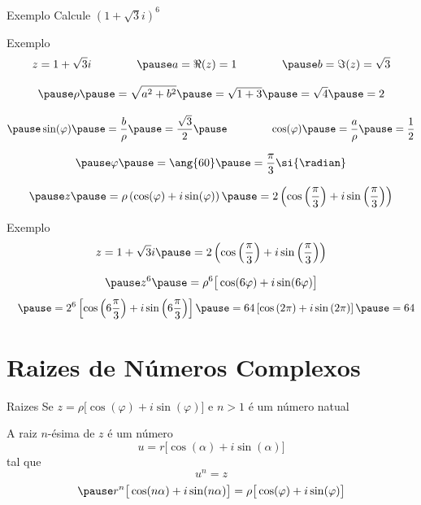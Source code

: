 \addtocounter{exemplo}{1}
\begin{frame}{Exemplo \theexemplo}
  Calcule \(\left(1+\sqrt{3}i\right)^6\)
\end{frame}

\begin{frame}{Exemplo \theexemplo}
  \[
    z = 1+\sqrt{3}i
    \qquad\qquad
    \pause
    a = \Re(z) = 1
    \qquad\qquad
    \pause
    b = \Im(z) = \sqrt{3}
  \]

  \[
    \pause
    \rho
    \pause
    = \sqrt{a^2 + b^2}
    \pause
    = \sqrt{1 + 3}
    \pause
    = \sqrt{4}
    \pause
    = 2
  \]

  \[
    \pause
    \sin(\varphi)
    \pause
    = \frac{b}{\rho}
    \pause
    = \frac{\sqrt{3}}{2}
    \pause
    \qquad\qquad
    \cos(\varphi)
    \pause
    = \frac{a}{\rho}
    \pause
    = \frac{1}{2}
  \]

  \[
    \pause
    \varphi
    \pause
    = \ang{60}
    \pause
    = \frac{\pi}{3} \si{\radian}
  \]

  \[
    \pause
    z
    \pause
    = \rho\left(\cos(\varphi)+i\sin(\varphi)\right)
    \pause
    = 2\left(\cos\left(\frac{\pi}{3}\right)+i\sin\left(\frac{\pi}{3}\right)\right)
  \]
\end{frame}

\begin{frame}{Exemplo \theexemplo}
  \[
    z = 1+\sqrt{3}i
    \pause
    = 2\left(\cos\left(\frac{\pi}{3}\right)+i\sin\left(\frac{\pi}{3}\right)\right)
  \]

  \vspace{0\baselineskip}
  \[
    \pause
    z^6
    \pause
    = \rho^6 \big[\cos(6\varphi) + i\sin(6\varphi)\big]
    \]
    \[
    \hphantom{z^6}
    \pause
    = 2^6 \left[\cos\left(6\frac{\pi}{3}\right) + i\sin\left(6\frac{\pi}{3}\right)\right]
    \pause
    = 64  \left[\cos\left(2\pi\right) + i\sin\left(2\pi\right)\right]
    \pause
    = 64
  \]
\end{frame}

\section{Raizes de Números Complexos}

\begin{frame}{Raizes}
  Se
  \(
    z = \rho \big[\cos(\varphi) + i\sin(\varphi)\big]
  \)
  e $n>1$ é um número natual

  \pause
  \vspace{\baselineskip}
  A raiz $n$-ésima de $z$ é um número
  \[
    u = r \big[\cos(\alpha) + i\sin(\alpha)\big]
  \]
  \pause
  tal que
  \[
    u^n = z
  \]
  \[
    \pause
    r^n \big[\cos(n\alpha) + i\sin(n\alpha)\big]
    = \rho \big[\cos(\varphi) + i\sin(\varphi)\big]
  \]
\end{frame}

